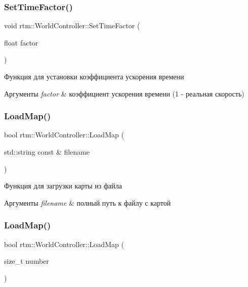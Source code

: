 \subsubsection{\texorpdfstring{Set\+Time\+Factor()}{SetTimeFactor()}}
{\footnotesize\ttfamily void rtm\+::\+World\+Controller\+::\+Set\+Time\+Factor (\begin{DoxyParamCaption}\item[{float}]{factor }\end{DoxyParamCaption})}



Функция для установки коэффициента ускорения времени 


\begin{DoxyParams}{Аргументы}
{\em factor} & коэффициент ускорения времени (1 -\/ реальная скорость) \\
\hline
\end{DoxyParams}
\mbox{\label{classrtm_1_1_world_controller_a66ec47d83ef2aa4bc88ef8dd91072491}} 
\subsubsection{\texorpdfstring{Load\+Map()}{LoadMap()}\hspace{0.1cm}{\footnotesize\ttfamily [1/2]}}
{\footnotesize\ttfamily bool rtm\+::\+World\+Controller\+::\+Load\+Map (\begin{DoxyParamCaption}\item[{std\+::string const \&}]{filename }\end{DoxyParamCaption})}



Функция для загрузки карты из файла 


\begin{DoxyParams}{Аргументы}
{\em filename} & полный путь к файлу с картой \\
\hline
\end{DoxyParams}
\mbox{\label{classrtm_1_1_world_controller_ada6f03eb6808d52ed7fc6af239851ff3}} 
\subsubsection{\texorpdfstring{Load\+Map()}{LoadMap()}\hspace{0.1cm}{\footnotesize\ttfamily [2/2]}}
{\footnotesize\ttfamily bool rtm\+::\+World\+Controller\+::\+Load\+Map (\begin{DoxyParamCaption}\item[{size\+\_\+t}]{number }\end{DoxyParamCaption})}




